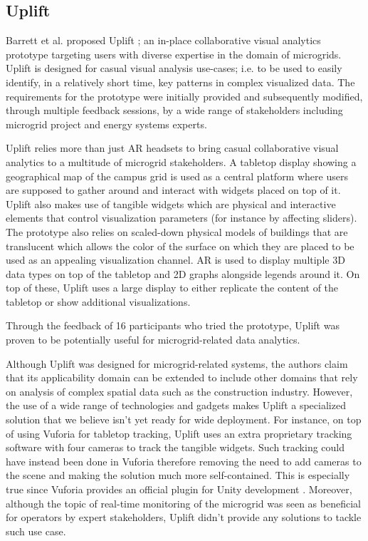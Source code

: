 \documentclass{vgtc}                          %
\begin{document}
\subsection{Uplift}
Barrett et al. proposed Uplift \cite{uplift_prototype}; an in-place
collaborative visual analytics prototype targeting users with diverse
expertise in the domain of microgrids. Uplift is designed for casual visual
analysis use-cases; i.e. to be used to easily identify, in a relatively short
time, key patterns in complex visualized data. The requirements for the
prototype were initially provided and subsequently modified, through multiple
feedback sessions, by a wide range of stakeholders including microgrid project
and energy systems experts.

\smallskip

\noindent Uplift relies more than just AR headsets to bring casual collaborative visual
analytics to a multitude of microgrid stakeholders. A tabletop display showing
a geographical map of the campus grid is used as a central platform where users
are supposed to gather around and interact with widgets placed on top of it.
Uplift also makes use of tangible
widgets which are physical and interactive elements that control visualization
parameters (for instance by affecting sliders). The prototype also relies on
scaled-down physical models of buildings that are translucent which allows
the color of the surface on which they are placed to be used as an appealing
visualization channel. AR is used to display multiple 3D data types on top of
the tabletop and 2D graphs alongside legends around it. On top of these, Uplift
uses a large display to either replicate the content of the tabletop or show
additional visualizations.

\smallskip

\noindent Through the feedback of 16 participants who tried the prototype, Uplift was
proven to be potentially useful for microgrid-related data analytics.

\smallskip

\noindent Although Uplift was designed for microgrid-related systems,
the authors claim that its applicability domain can be extended to include
other domains that rely on analysis of complex spatial data such as
the construction industry. However, the use of a wide range of technologies
and gadgets makes Uplift a specialized solution that we believe isn't yet
ready for wide deployment. For instance, on top of using Vuforia for tabletop
tracking, Uplift uses an extra proprietary tracking software with four cameras
to track the tangible widgets. Such tracking could have instead been done in
Vuforia therefore removing the need to add cameras to the scene and making the
solution much more self-contained. This is especially true since Vuforia provides
an official plugin for Unity development \cite{unity:vuforia_plugin}.
Moreover, although the topic of real-time monitoring of the microgrid was seen
as beneficial for operators by expert stakeholders, Uplift didn't provide any
solutions to tackle such use case.
\end{document}
